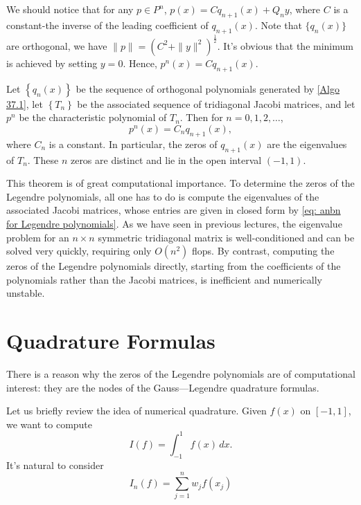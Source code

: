  We should notice that for any $ p \in P^{n} $, $ p(x) = Cq_{n+1}(x) +Q_ny $, where $ C $ is a constant-the inverse of the leading coefficient of $ q_{n+1}(x) $. Note that $ \{q_n(x)\}  $ are orthogonal, we have $ \|p\| = (C^{2} +\|y\|^{2} )^{\frac{1}{2}} $. It's obvious that the minimum is achieved by setting $ y=0 $. Hence, $ p^n(x) = C q_{n+1}(x) $.  

 
 \begin{theorem}
 \label{thm: chractersitic polynomial of Tn}
 Let $\left\{q_n(x)\right\}$ be the sequence of orthogonal polynomials generated by \autoref{Algo 37.1}, let $\left\{T_n\right\}$ be the associated sequence of tridiagonal Jacobi matrices, and let $p^n$ be the characteristic polynomial of $T_n$. Then for $n=0,1,2, \ldots$,
\begin{equation}
\label{eq: chractersitic polynomial of Tn}
p^n(x)=C_n q_{n+1}(x),
\end{equation}
where $C_n$ is a constant. In particular, the zeros of $q_{n+1}(x)$ are the eigenvalues of $T_n$. These $n$ zeros are distinct and lie in the open interval $(-1,1)$.
 \end{theorem}
 
 This theorem is of great computational importance. To determine the zeros of the Legendre polynomials, all one has to do is compute the eigenvalues of the associated Jacobi matrices, whose entries are given in closed form by \eqref{eq: anbn for Legendre polynomials}. As we have seen in previous lectures, the eigenvalue problem for an $n \times n$ symmetric tridiagonal matrix is well-conditioned and can be solved very quickly, requiring only $O\left(n^2\right)$ flops. By contrast, computing the zeros of the Legendre polynomials directly, starting from the coefficients of the polynomials rather than the Jacobi matrices, is inefficient and numerically unstable.

 \section{Quadrature Formulas} 
There is a reason why the zeros of the Legendre polynomials are of computational interest: they are the nodes of the Gauss—Legendre quadrature formulas. 

Let us briefly review the idea of numerical quadrature. Given $ f(x)$ on $ [-1,1] $, we want to compute 
\[
    I(f) = \int_{-1}^{1} f(x)\,dx.  
\]
It's natural to consider 
\begin{equation}
\label{eq: quadrature formula}
        I_n(f) = \sum_{j=1}^{n} w_j f(x_j) 
\end{equation}

